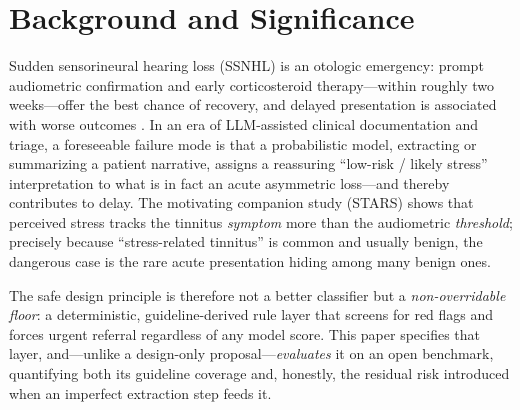 \documentclass[11pt]{article}
\begin{document}
\section{Background and Significance}
Sudden sensorineural hearing loss (SSNHL) is an otologic emergency: prompt audiometric confirmation and early corticosteroid therapy---within roughly two weeks---offer the best chance of recovery, and delayed presentation is associated with worse outcomes \cite{chandrasekhar2019ssnhl}. In an era of LLM-assisted clinical documentation and triage, a foreseeable failure mode is that a probabilistic model, extracting or summarizing a patient narrative, assigns a reassuring ``low-risk / likely stress'' interpretation to what is in fact an acute asymmetric loss---and thereby contributes to delay. The motivating companion study (STARS) shows that perceived stress tracks the tinnitus \emph{symptom} more than the audiometric \emph{threshold}; precisely because ``stress-related tinnitus'' is common and usually benign, the dangerous case is the rare acute presentation hiding among many benign ones.

The safe design principle is therefore not a better classifier but a \emph{non-overridable floor}: a deterministic, guideline-derived rule layer that screens for red flags and forces urgent referral regardless of any model score. This paper specifies that layer, and---unlike a design-only proposal---\emph{evaluates} it on an open benchmark, quantifying both its guideline coverage and, honestly, the residual risk introduced when an imperfect extraction step feeds it.
\end{document}
